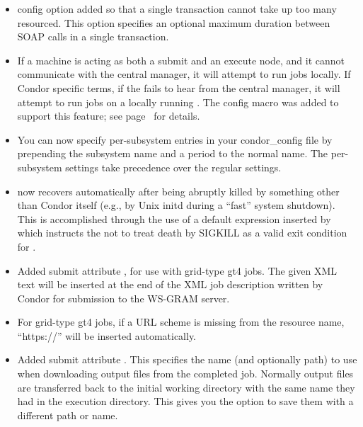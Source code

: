 \begin{itemize}
\item {} config option added so that a
  single transaction cannot take up too many 
  resourced. This option specifies an optional maximum duration
  between SOAP calls in a single transaction.

\item If a machine is acting as both a submit and an execute node, and it
  cannot communicate with the central manager, it will attempt to run jobs
  locally.  If Condor specific terms, if the  fails to hear
  from the central manager, it will attempt to run jobs on a locally running
  .  The  config
  macro was added to support this feature; see
  page~\pageref{param:ScheddAssumeNegotiatorGone} for details.

\item You can now specify per-subsystem entries in your condor\_config file
by prepending the subsystem name and a period to the normal name.  The
per-subsystem settings take precedence over the regular settings.

\item {} now recovers automatically after being abruptly
killed by something other than Condor itself (e.g., by Unix initd
during a ``fast'' system shutdown).  This is accomplished through the
use of a default  expression inserted by
 which instructs the  not to treat
death by SIGKILL as a valid exit condition for .

\item Added submit attribute , for use with grid-type
gt4 jobs. The given XML text will be inserted at the end of the XML job
description written by Condor for submission to the WS-GRAM server.

\item For grid-type gt4 jobs, if a URL scheme is missing from the resource
name, ``https://'' will be inserted automatically.

\item Added submit attribute .
This specifies the name (and optionally path) to use when downloading output
files from the completed job.  Normally output files are transferred back
to the initial working directory with the same name they had in the execution
directory.  This gives you the option to save them with a different path
or name.

\end{itemize}


